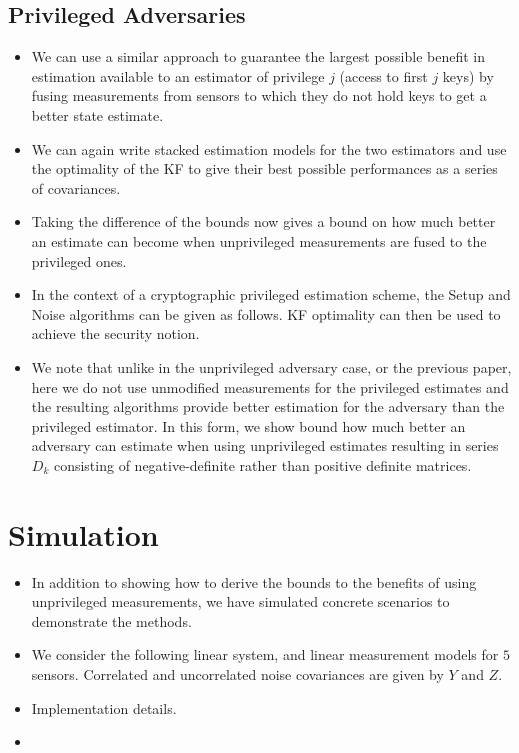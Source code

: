 \documentclass[conference]{IEEEtran}
\begin{document}
\subsection{Privileged Adversaries}
\begin{itemize}
  \item We can use a similar approach to guarantee the largest possible benefit in estimation available to an estimator of privilege $j$ (access to first $j$ keys) by fusing measurements from sensors to which they do not hold keys to get a better state estimate.
  \item We can again write stacked estimation models for the two estimators and use the optimality of the KF to give their best possible performances as a series of covariances.
  \item Taking the difference of the bounds now gives a bound on how much better an estimate can become when unprivileged measurements are fused to the privileged ones.
  \item In the context of a cryptographic privileged estimation scheme, the Setup and Noise algorithms can be given as follows. KF optimality can then be used to achieve the security notion.
  \item We note that unlike in the unprivileged adversary case, or the previous paper, here we do not use unmodified measurements for the privileged estimates and the resulting algorithms provide better estimation for the adversary than the privileged estimator. In this form, we show bound how much better an adversary can estimate when using unprivileged estimates resulting in series $D_k$ consisting of negative-definite rather than positive definite matrices.
\end{itemize}


\section{Simulation}
\begin{itemize}
  \item In addition to showing how to derive the bounds to the benefits of using unprivileged measurements, we have simulated concrete scenarios to demonstrate the methods.
  \item We consider the following linear system, and linear measurement models for $5$ sensors. Correlated and uncorrelated noise covariances are given by $Y$ and $Z$.
  \item Implementation details.
  \item 
\end{itemize}
\end{document}
